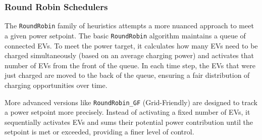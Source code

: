 \subsubsection{Round Robin Schedulers}
The \texttt{RoundRobin} family of heuristics attempts a more nuanced approach to meet a given power setpoint. The basic \texttt{RoundRobin} algorithm maintains a queue of connected EVs. To meet the power target, it calculates how many EVs need to be charged simultaneously (based on an average charging power) and activates that number of EVs from the front of the queue. In each time step, the EVs that were just charged are moved to the back of the queue, ensuring a fair distribution of charging opportunities over time.

\noindent
More advanced versions like \texttt{RoundRobin\_GF} (Grid-Friendly) are designed to track a power setpoint more precisely. Instead of activating a fixed number of EVs, it sequentially activates EVs and sums their potential power contribution until the setpoint is met or exceeded, providing a finer level of control.
